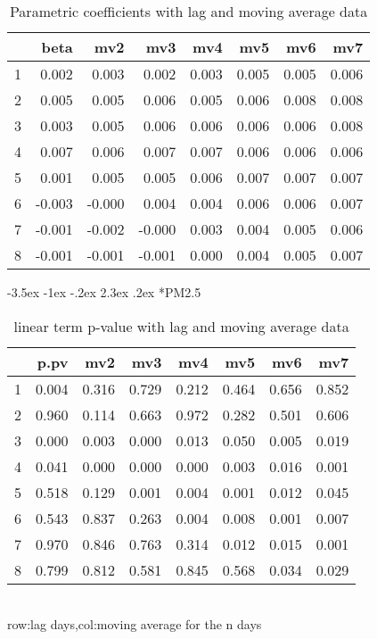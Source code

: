 \documentclass[a4paper, 12pt]{article}
\makeatletter
\def\large{\fontsize{14}{20}\selectfont}
\renewcommand\subsection{\@startsection {subsection}{1}{\z@}%
                                   {-3.5ex \@plus -1ex \@minus -.2ex}%
                                   {2.3ex \@plus.2ex}%
                                   {\centering\normalfont\large\bfseries}}
\makeatother
\begin{document}
\begin{table}[h]
\centering
\caption{Parametric coefficients with lag and moving average data}
\begin{tabular}{rrrrrrrr}
  \hline
 & beta & mv2 & mv3 & mv4 & mv5 & mv6 & mv7 \\
  \hline
1 & 0.002 & 0.003 & 0.002 & 0.003 & 0.005 & 0.005 & 0.006 \\
  2 & 0.005 & 0.005 & 0.006 & 0.005 & 0.006 & 0.008 & 0.008 \\
  3 & 0.003 & 0.005 & 0.006 & 0.006 & 0.006 & 0.006 & 0.008 \\
  4 & 0.007 & 0.006 & 0.007 & 0.007 & 0.006 & 0.006 & 0.006 \\
  5 & 0.001 & 0.005 & 0.005 & 0.006 & 0.007 & 0.007 & 0.007 \\
  6 & -0.003 & -0.000 & 0.004 & 0.004 & 0.006 & 0.006 & 0.007 \\
  7 & -0.001 & -0.002 & -0.000 & 0.003 & 0.004 & 0.005 & 0.006 \\
  8 & -0.001 & -0.001 & -0.001 & 0.000 & 0.004 & 0.005 & 0.007 \\
   \hline
\end{tabular}
\end{table}
\clearpage
\subsection*{PM2.5}
\begin{table}[h]
\centering
\caption{linear term p-value with lag and moving average data}
\begin{tabular}{rrrrrrrr}
  \hline
 & p.pv & mv2 & mv3 & mv4 & mv5 & mv6 & mv7 \\
  \hline
1 & 0.004 & 0.316 & 0.729 & 0.212 & 0.464 & 0.656 & 0.852 \\
  2 & 0.960 & 0.114 & 0.663 & 0.972 & 0.282 & 0.501 & 0.606 \\
  3 & 0.000 & 0.003 & 0.000 & 0.013 & 0.050 & 0.005 & 0.019 \\
  4 & 0.041 & 0.000 & 0.000 & 0.000 & 0.003 & 0.016 & 0.001 \\
  5 & 0.518 & 0.129 & 0.001 & 0.004 & 0.001 & 0.012 & 0.045 \\
  6 & 0.543 & 0.837 & 0.263 & 0.004 & 0.008 & 0.001 & 0.007 \\
  7 & 0.970 & 0.846 & 0.763 & 0.314 & 0.012 & 0.015 & 0.001 \\
  8 & 0.799 & 0.812 & 0.581 & 0.845 & 0.568 & 0.034 & 0.029 \\
   \hline
\end{tabular}
\\row:lag days,col:moving average for the n days
\end{table}
\end{document}
